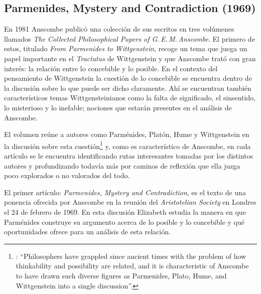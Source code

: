 \subsection{Parmenides, Mystery and Contradiction (1969)}

En 1981 Anscombe publicó una colección de sus escritos en tres volúmenes llamados \emph{The Collected Philosophical Papers of G.\,E.\,M.\,Anscombe}. El primero de estos, titulado \emph{From Parmenides to Wittgenstein}, recoge un tema que juega un papel importante en el \emph{Tractatus} de Wittgenstein y que Anscombe trató con gran interés: la relación entre lo concebible y lo posible. En el contexto del pensamiento de Wittgenstein la cuestión de lo concebible se encuentra dentro de la discusión sobre lo que puede ser dicho claramente. Ahí se encuentran también característicos temas Wittgensteinianos como la falta de significado, el sinsentido, lo misterioso y lo inefable; nociones que estarán presentes en el análisis de Anscombe.

El volumen reúne a autores como Parménides, Platón, Hume y Wittgenstein en la discusión sobre esta cuestión\footnote{\cite[Cf.][193]{teichmann2008ans}: \enquote{Philosophers have grappled since ancient times with the problem of how thinkability and possibility are related, and it is characteristic of Anscombe to have drawn such diverse figures as Parmenides, Plato, Hume, and Wittgenstein into a single discussion}.} y, como es característico de Anscombe, en cada artículo se le encuentra identificando rutas interesantes tomadas por los distintos autores y profundizando todavía más por caminos de reflexión que ella juzga poco explorados o no valorados del todo.

El primer artículo: \emph{Parmenides, Mystery and Contradiction}, es el texto de una ponencia ofrecida por Anscombe en la reunión del \emph{Aristotelian Society} en Londres el 24 de febrero de 1969. En esta discusión Elizabeth estudia la manera en que Parménides construye su argumento acerca de lo posible y lo concebible y qué oportunidades ofrece para un análisis de esta relación.

